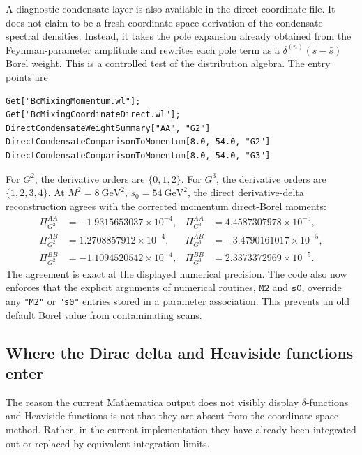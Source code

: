 \documentclass[11pt]{article}
\begin{document}
A diagnostic condensate layer is also available in the direct-coordinate
file.  It does not claim to be a fresh coordinate-space derivation of the
condensate spectral densities.  Instead, it takes the pole expansion already
obtained from the Feynman-parameter amplitude and rewrites each pole term as
a \(\delta^{(n)}(s-\bar s)\) Borel weight.  This is a controlled test of the
distribution algebra.  The entry points are
\begin{verbatim}
Get["BcMixingMomentum.wl"];
Get["BcMixingCoordinateDirect.wl"];
DirectCondensateWeightSummary["AA", "G2"]
DirectCondensateComparisonToMomentum[8.0, 54.0, "G2"]
DirectCondensateComparisonToMomentum[8.0, 54.0, "G3"]
\end{verbatim}
For \(G^2\), the derivative orders are \(\{0,1,2\}\).  For \(G^3\), the
derivative orders are \(\{1,2,3,4\}\).  At \(M^2=8~\mathrm{GeV}^2\),
\(s_0=54~\mathrm{GeV}^2\), the direct derivative-delta reconstruction agrees
with the corrected momentum direct-Borel moments:
\begin{align}
  \Pi_{G^2}^{AA}
  &=
  -1.9315653037\times10^{-4},&
  \Pi_{G^3}^{AA}
  &=
  4.4587307978\times10^{-5},\\
  \Pi_{G^2}^{AB}
  &=
  1.2708857912\times10^{-4},&
  \Pi_{G^3}^{AB}
  &=
  -3.4790161017\times10^{-5},\\
  \Pi_{G^2}^{BB}
  &=
  -1.1094520542\times10^{-4},&
  \Pi_{G^3}^{BB}
  &=
  2.3373372969\times10^{-5}.
\end{align}
The agreement is exact at the displayed numerical precision.  The code also
now enforces that the explicit arguments of numerical routines,
\(\texttt{M2}\) and \(\texttt{s0}\), override any \texttt{"M2"} or
\texttt{"s0"} entries stored in a parameter association.  This prevents an
old default Borel value from contaminating scans.

\subsection{Where the Dirac delta and Heaviside functions enter}

The reason the current Mathematica output does not visibly display
\(\delta\)-functions and Heaviside functions is not that they are absent from
the coordinate-space method.  Rather, in the current implementation they have
already been integrated out or replaced by equivalent integration limits.
\end{document}
